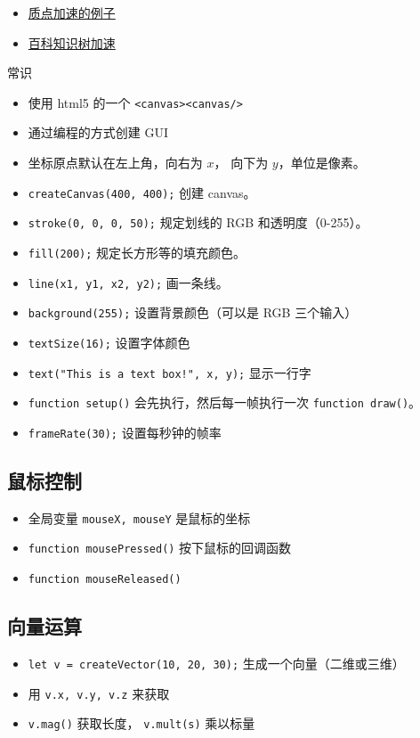 
\begin{itemize}
\item \href{https://wuli.wiki/apps/PtAcc/}{质点加速的例子}
\item \href{https://wuli.wiki/apps/TwoBallSpring/}{百科知识树加速}
\end{itemize}

常识
\begin{itemize}
\item 使用 html5 的一个 \verb`<canvas><canvas/>`
\item 通过编程的方式创建 GUI
\item 坐标原点默认在左上角，向右为 $x$， 向下为 $y$，单位是像素。
\item \verb`createCanvas(400, 400);` 创建 canvas。
\item \verb`stroke(0, 0, 0, 50);` 规定划线的 RGB 和透明度（0-255）。
\item \verb`fill(200);` 规定长方形等的填充颜色。
\item \verb`line(x1, y1, x2, y2);` 画一条线。
\item \verb`background(255);` 设置背景颜色（可以是 RGB 三个输入）
\item \verb`textSize(16);` 设置字体颜色
\item \verb`text("This is a text box!", x, y);` 显示一行字
\item \verb`function setup()` 会先执行，然后每一帧执行一次 \verb`function draw()`。
\item \verb`frameRate(30);` 设置每秒钟的帧率
\end{itemize}

\subsection{鼠标控制}
\begin{itemize}
\item 全局变量 \verb`mouseX, mouseY` 是鼠标的坐标
\item \verb`function mousePressed()` 按下鼠标的回调函数
\item \verb`function mouseReleased()`
\end{itemize}

\subsection{向量运算}
\begin{itemize}
\item \verb`let v = createVector(10, 20, 30);` 生成一个向量（二维或三维）
\item 用 \verb`v.x, v.y, v.z` 来获取
\item \verb`v.mag()` 获取长度， \verb`v.mult(s)` 乘以标量
\end{itemize}


